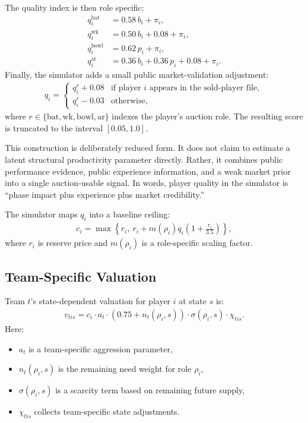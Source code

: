 \documentclass[11pt]{article}
\begin{document}
The quality index is then role specific:
\begin{align}
q_i^{\text{bat}} &= 0.58\, b_i + \pi_i,\\
q_i^{\text{wk}} &= 0.50\, b_i + 0.08 + \pi_i,\\
q_i^{\text{bowl}} &= 0.62\, p_i + \pi_i,\\
q_i^{\text{ar}} &= 0.36\, b_i + 0.36\, p_i + 0.08 + \pi_i.
\end{align}
Finally, the simulator adds a small public market-validation adjustment:
\begin{align}
q_i
=
\begin{cases}
q_i^{r}+0.08 & \text{if player } i \text{ appears in the sold-player file},\\
q_i^{r}-0.03 & \text{otherwise},
\end{cases}
\end{align}
where \(r\in\{\text{bat},\text{wk},\text{bowl},\text{ar}\}\) indexes the player's auction role. The resulting score is truncated to the interval \([0.05,1.0]\).

This construction is deliberately reduced form. It does not claim to estimate a latent structural productivity parameter directly. Rather, it combines public performance evidence, public experience information, and a weak market prior into a single auction-usable signal. In words, player quality in the simulator is ``phase impact plus experience plus market credibility.''

The simulator maps \(q_i\) into a baseline ceiling:
\begin{align}
c_i = \max\left\{r_i,\ r_i + m(\rho_i)q_i\left(1+\frac{r_i}{3.5}\right)\right\},
\end{align}
where \(r_i\) is reserve price and \(m(\rho_i)\) is a role-specific scaling factor.

\subsection{Team-Specific Valuation}

Team \(t\)'s state-dependent valuation for player \(i\) at state \(s\) is:
\begin{align}
v_{tis}
=
c_i\cdot a_t\cdot \left(0.75+n_t(\rho_i,s)\right)\cdot \sigma(\rho_i,s)\cdot \chi_{tis}.
\end{align}
Here:
\begin{itemize}[leftmargin=1.5em]
    \item \(a_t\) is a team-specific aggression parameter,
    \item \(n_t(\rho_i,s)\) is the remaining need weight for role \(\rho_i\),
    \item \(\sigma(\rho_i,s)\) is a scarcity term based on remaining future supply,
    \item \(\chi_{tis}\) collects team-specific state adjustments.
\end{itemize}
\end{document}
